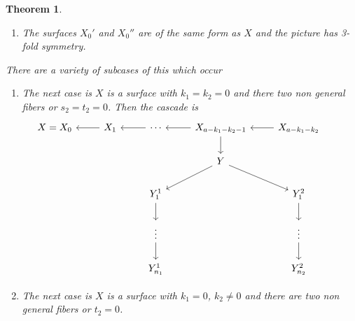 \documentclass[12pt,a4paper]{book}      %
\newtheorem{thm}{Theorem}[section]
\theoremstyle{definition}
\begin{document}
\begin{thm}
\begin{enumerate}
\item The surfaces $X_0'$ and $X_0''$ are of the same form as $X$ and the picture has 3-fold symmetry.
\end{enumerate}
There are a variety of subcases of this which occur 
\begin{enumerate}
\item The next case is $X$ is a surface with $k_1 = k_2 = 0$ and there two non general fibers or $s_2 = t_2 = 0$. Then the cascade is 
\[
\begin{tikzcd}
X = X_0 & X_1 \arrow[l] & \cdots \arrow[l] & X_{a-k_1-k_2-1} \arrow[l] \arrow[d] & X_{a-k_1-k_2} \arrow[l]  &  \\
        &               &                  & Y \arrow[ld] \arrow[rd]             &                                   &                     \\
        &               & Y_1^1 \arrow[d]  &                                     & Y_1^2 \arrow[d]                   &                     \\
        &               & \vdots \arrow[d] &                                     & \vdots \arrow[d]                  &                     \\
        &               & Y_{n_1}^1        &                                     & Y_{n_2}^2                         &                    
\end{tikzcd}
\]
\item The next case is $X$ is a surface with $k_1 = 0$, $k_2 \neq 0$ and there are two non general fibers or $t_2 = 0$. 
\[
\]
\end{enumerate}
\end{thm}
\end{document}
